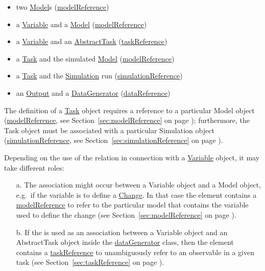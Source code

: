 \begin{itemize}
	\item{two \hyperref[class:model]{Model}s (\hyperref[sec:modelReference]{modelReference})}
	\item{a \hyperref[class:variable]{Variable} and a \hyperref[class:model]{Model} (\hyperref[sec:modelReference]{modelReference})}
	\item{a \hyperref[class:variable]{Variable} and an \hyperref[class:abstractTask]{AbstractTask} (\hyperref[sec:taskReference]{taskReference})}
	\item{a \hyperref[class:task]{Task} and the simulated \hyperref[class:model]{Model} (\hyperref[sec:modelReference]{modelReference})}
	\item{a \hyperref[class:task]{Task} and the \hyperref[class:simulation]{Simulation} run (\hyperref[sec:simulationReference]{simulationReference})}
	\item{an \hyperref[class:output]{Output} and a \hyperref[class:dataGenerator]{DataGenerator} (\hyperref[sec:dataReference]{dataReference})}
\end{itemize}

The definition of a \hyperref[class:task]{Task} object requires a reference to a particular Model object (\hyperref[sec:modelReference]{modelReference}, see Section~\ref{sec:modelReference} on page \pageref{sec:modelReference}); furthermore, the Task object must be associated with a particular Simulation object (\hyperref[sec:simulationReference]{simulationReference}, see Section~\ref{sec:simulationReference} on page \pageref{sec:simulationReference}).

Depending on the use of the  relation in connection with a \hyperref[class:variable]{Variable} object, it may take different roles: 

\begin{enumerate}
\item[a.]{The  association might occur between a Variable object and a Model object, e.g.\ if the variable is to define a \hyperref[class:change]{Change}. 
In that case the  element contains a \hyperref[sec:modelReference]{modelReference} to refer to the particular model that contains the variable used to define the change (see Section~\ref{sec:modelReference} on page \pageref{sec:modelReference}). }
\item[b.]{If the  is used as an association between a Variable object and an AbstractTask object inside the \hyperref[class:dataGenerator]{dataGenerator} class, then the  element contains a \hyperref[sec:taskReference]{taskReference} to unambiguously refer to an observable in a given task (see Section~\ref{sec:taskReference} on page \pageref{sec:taskReference}).}
\end{enumerate}


